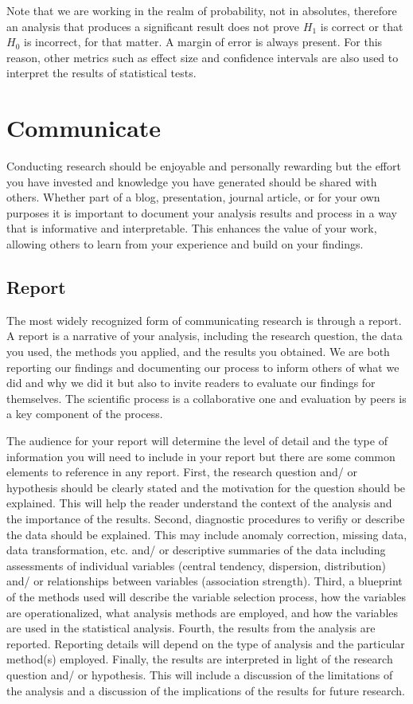 \documentclass[
  letterpaper,
]{latex/krantz}
\theoremstyle{definition}
\theoremstyle{remark}
\begin{document}
Note that we are working in the realm of probability, not in absolutes,
therefore an analysis that produces a significant result does not prove
\(H_1\) is correct or that \(H_0\) is incorrect, for that matter. A
margin of error is always present. For this reason, other metrics such
as effect size and confidence intervals are also used to interpret the
results of statistical tests.

\section{Communicate}\label{sec-aa-communicate}

Conducting research should be enjoyable and personally rewarding but the
effort you have invested and knowledge you have generated should be
shared with others. Whether part of a blog, presentation, journal
article, or for your own purposes it is important to document your
analysis results and process in a way that is informative and
interpretable. This enhances the value of your work, allowing others to
learn from your experience and build on your findings.

\subsection{Report}\label{sec-aa-report}

The most widely recognized form of communicating research is through a
report. A report is a narrative of your analysis, including the research
question, the data you used, the methods you applied, and the results
you obtained. We are both reporting our findings and documenting our
process to inform others of what we did and why we did it but also to
invite readers to evaluate our findings for themselves. The scientific
process is a collaborative one and evaluation by peers is a key
component of the process.

The audience for your report will determine the level of detail and the
type of information you will need to include in your report but there
are some common elements to reference in any report. First, the research
question and/ or hypothesis should be clearly stated and the motivation
for the question should be explained. This will help the reader
understand the context of the analysis and the importance of the
results. Second, diagnostic procedures to verifiy or describe the data
should be explained. This may include anomaly correction, missing data,
data transformation, etc. and/ or descriptive summaries of the data
including assessments of individual variables (central tendency,
dispersion, distribution) and/ or relationships between variables
(association strength). Third, a blueprint of the methods used will
describe the variable selection process, how the variables are
operationalized, what analysis methods are employed, and how the
variables are used in the statistical analysis. Fourth, the results from
the analysis are reported. Reporting details will depend on the type of
analysis and the particular method(s) employed. Finally, the results are
interpreted in light of the research question and/ or hypothesis. This
will include a discussion of the limitations of the analysis and a
discussion of the implications of the results for future research.
\end{document}
